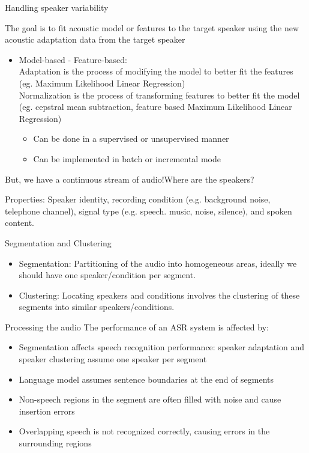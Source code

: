 \begin{frame}{Handling speaker variability}

The goal is to fit acoustic model or features to the target speaker using the new acoustic adaptation data from the target speaker

\begin{itemize}

\item {\color{blue} Model-based - Feature-based:} \\
{\color{red} Adaptation} is the process of modifying the model to better fit the features  (eg. Maximum Likelihood Linear Regression)\\
{\color{red} Normalization}  is the process of transforming features to better fit  the model (eg. cepstral mean subtraction, feature based Maximum Likelihood Linear Regression)\\
\begin{itemize}
\item Can be done in a supervised or unsupervised manner
\item Can be implemented in batch or incremental mode
\end{itemize}
\end{itemize}
\end{frame}


\begin{frame}{But, we have a continuous stream of audio!}{Where are the speakers?}

{\color{blue} Properties:} Speaker identity, recording condition (e.g. background noise, telephone channel),
signal type (e.g. speech. music, noise, silence), and spoken content.

Segmentation and Clustering
\begin{itemize}
\item {\color{red} Segmentation:} Partitioning of the audio into homogeneous areas, ideally we should have one speaker/condition per segment.
\item {\color{red} Clustering:} Locating speakers and conditions involves the clustering of these segments into similar speakers/conditions.
\end{itemize}
\end{frame}

\begin{frame}{Processing the audio}
The performance of an ASR system is affected by:
\begin{itemize}
\item Segmentation affects speech recognition performance: speaker adaptation and speaker clustering assume one speaker per segment
\item Language model assumes sentence boundaries at the end of segments
\item Non-speech regions in the segment are often filled with noise and cause insertion errors
\item Overlapping speech is not recognized correctly, causing errors in the surrounding regions
\end{itemize}
\end{frame}

